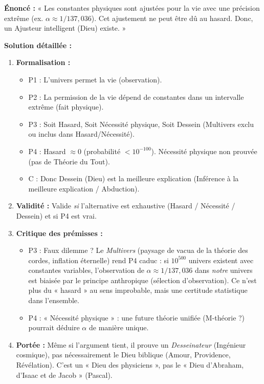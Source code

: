\documentclass[11pt]{article}
\begin{document}
\begin{exoresolu}
\textbf{Énoncé :} « Les constantes physiques sont ajustées pour la vie avec une précision extrême (ex. $\alpha \approx 1/137,036$). Cet ajustement ne peut être dû au hasard. Donc, un Ajusteur intelligent (Dieu) existe. »

\textbf{Solution détaillée :}
\begin{enumerate}
    \item \textbf{Formalisation :}
    \begin{itemize}
        \item P1 : L'univers permet la vie (observation).
        \item P2 : La permission de la vie dépend de constantes dans un intervalle extrême (fait physique).
        \item P3 : Soit Hasard, Soit Nécessité physique, Soit Dessein (Multivers exclu ou inclus dans Hasard/Nécessité).
        \item P4 : Hasard $\approx 0$ (probabilité $< 10^{-100}$). Nécessité physique non prouvée (pas de Théorie du Tout).
        \item C : Donc Dessein (Dieu) est la meilleure explication (Inférence à la meilleure explication / Abduction).
    \end{itemize}
    \item \textbf{Validité :} Valide \emph{si} l'alternative est exhaustive (Hasard / Nécessité / Dessein) et si P4 est vrai.
    \item \textbf{Critique des prémisses :}
    \begin{itemize}
        \item P3 : Faux dilemme ? Le \emph{Multivers} (paysage de vacua de la théorie des cordes, inflation éternelle) rend P4 caduc : si $10^{500}$ univers existent avec constantes variables, l'observation de $\alpha \approx 1/137,036$ dans \emph{notre} univers est biaisée par le principe anthropique (sélection d'observation). Ce n'est plus du « hasard » au sens improbable, mais une certitude statistique dans l'ensemble.
        \item P4 : « Nécessité physique » : une future théorie unifiée (M-théorie ?) pourrait déduire $\alpha$ de manière unique.
    \end{itemize}
    \item \textbf{Portée :} Même si l'argument tient, il prouve un \emph{Desseinateur} (Ingénieur cosmique), pas nécessairement le Dieu biblique (Amour, Providence, Révélation). C'est un « Dieu des physiciens », pas le « Dieu d'Abraham, d'Isaac et de Jacob » (Pascal).
\end{enumerate}
\end{exoresolu}
\end{document}
